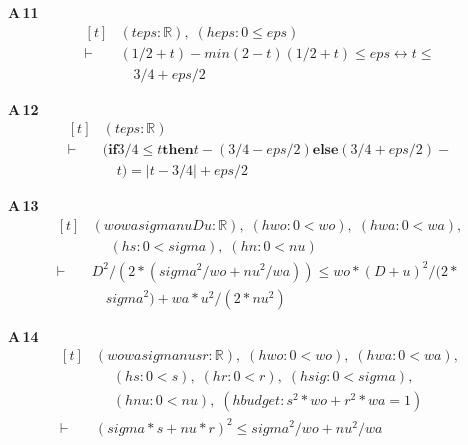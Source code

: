 \noindent\textbf{A\,11}\quad{}
{\footnotesize\[ \begin{aligned}[t]
&(\mathit{t} \mathit{eps} : \mathbb{R} ),\; (\mathit{heps} : 0 \leq \mathit{eps})\\
\vdash\;&(1 / 2 + \mathit{t}) - \mathit{min} (2 - \mathit{t}) (1 / 2 + \mathit{t}) \leq \mathit{eps} \leftrightarrow \mathit{t} \leq\\
&\quad 3 / 4 + \mathit{eps} / 2
\end{aligned} \]}

\noindent\textbf{A\,12}\quad{}
{\footnotesize\[ \begin{aligned}[t]
&(\mathit{t} \mathit{eps} : \mathbb{R} )\\
\vdash\;&(\mathbf{if} 3 / 4 \leq \mathit{t} \mathbf{then} \mathit{t} - (3 / 4 - \mathit{eps} / 2) \mathbf{else} (3 / 4 + \mathit{eps} / 2) -\\
&\quad \mathit{t}) = |\mathit{t} - 3 / 4| + \mathit{eps} / 2
\end{aligned} \]}

\noindent\textbf{A\,13}\quad{}
{\footnotesize\[ \begin{aligned}[t]
&(\mathit{wo} \mathit{wa} \mathit{sigma} \mathit{nu} \mathit{D} \mathit{u} : \mathbb{R} ),\; (\mathit{hwo} : 0 < \mathit{wo}),\; (\mathit{hwa} : 0 < \mathit{wa}),\\
&\quad \; (\mathit{hs} : 0 < \mathit{sigma}),\; (\mathit{hn} : 0 < \mathit{nu})\\
\vdash\;&\mathit{D} ^{2} / (2 * (\mathit{sigma} ^{2} / \mathit{wo} + \mathit{nu} ^{2} / \mathit{wa})) \leq \mathit{wo} * (\mathit{D} + \mathit{u}) ^{2} / (2 *\\
&\quad \mathit{sigma} ^{2}) + \mathit{wa} * \mathit{u} ^{2} / (2 * \mathit{nu} ^{2})
\end{aligned} \]}

\noindent\textbf{A\,14}\quad{}
{\footnotesize\[ \begin{aligned}[t]
&(\mathit{wo} \mathit{wa} \mathit{sigma} \mathit{nu} \mathit{s} \mathit{r} : \mathbb{R} ),\; (\mathit{hwo} : 0 < \mathit{wo}),\; (\mathit{hwa} : 0 < \mathit{wa}),\\
&\quad \; (\mathit{hs} : 0 < \mathit{s}),\; (\mathit{hr} : 0 < \mathit{r}),\; (\mathit{hsig} : 0 < \mathit{sigma}),\\
&\quad \; (\mathit{hnu} : 0 < \mathit{nu}),\; (\mathit{hbudget} : \mathit{s} ^{2} * \mathit{wo} + \mathit{r} ^{2} * \mathit{wa} = 1)\\
\vdash\;&(\mathit{sigma} * \mathit{s} + \mathit{nu} * \mathit{r}) ^{2} \leq \mathit{sigma} ^{2} / \mathit{wo} + \mathit{nu} ^{2} / \mathit{wa}
\end{aligned} \]}

